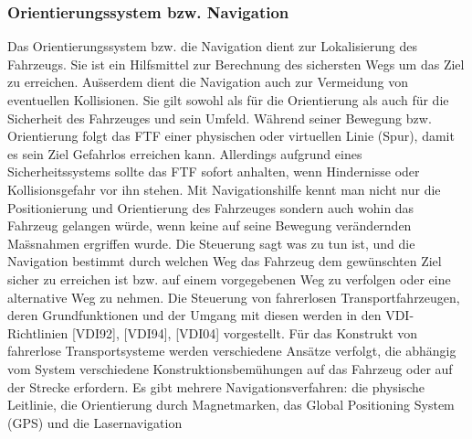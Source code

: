 \subsubsection{Orientierungssystem bzw. Navigation}
Das Orientierungssystem bzw. die Navigation dient zur Lokalisierung des Fahrzeugs. Sie ist ein Hilfsmittel zur Berechnung des sichersten Wegs um das Ziel zu erreichen. Au\"sserdem dient die Navigation auch zur Vermeidung von eventuellen Kollisionen. Sie gilt sowohl als f\"ur die Orientierung als auch f\"ur die Sicherheit des Fahrzeuges und sein Umfeld. W\"ahrend seiner Bewegung bzw. Orientierung folgt das FTF einer physischen oder virtuellen Linie (Spur), damit es sein Ziel Gefahrlos erreichen kann. Allerdings aufgrund eines Sicherheitssystems sollte das FTF sofort anhalten, wenn Hindernisse oder Kollisionsgefahr vor ihn stehen. 
Mit Navigationshilfe kennt man nicht nur die Positionierung und Orientierung des Fahrzeuges sondern auch wohin das Fahrzeug gelangen w\"urde, wenn keine auf seine Bewegung ver\"andernden Ma\"ssnahmen ergriffen wurde. Die Steuerung sagt was zu tun ist, und die Navigation bestimmt durch welchen Weg das Fahrzeug dem gew\"unschten Ziel sicher zu erreichen ist bzw. auf einem vorgegebenen Weg zu verfolgen oder eine alternative Weg zu nehmen. Die Steuerung von fahrerlosen Transportfahrzeugen, deren Grundfunktionen und der Umgang mit diesen werden in den VDI- Richtlinien [VDI92], [VDI94], [VDI04] vorgestellt. F\"ur das Konstrukt von fahrerlose Transportsysteme werden verschiedene Ans\"atze verfolgt, die  abh\"angig vom System verschiedene Konstruktionsbem\"uhungen auf das Fahrzeug oder auf der Strecke erfordern. Es gibt mehrere Navigationsverfahren: die physische Leitlinie, die Orientierung durch Magnetmarken, das Global Positioning System (GPS) und die Lasernavigation \cite[S. 112]{Guenther:2011}
